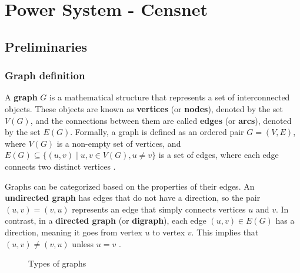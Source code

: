 \chapter{Power System - Censnet} \label{cap:mpcc}

\section{Preliminaries}

\subsection{Graph definition}


A \textbf{graph} $G$ is a mathematical structure that represents a set of interconnected objects. These objects are known as \textbf{vertices} (or \textbf{nodes}), denoted by the set $V(G)$, and the connections between them are called \textbf{edges} (or \textbf{arcs}), denoted by the set $E(G)$. Formally, a graph is defined as an ordered pair $G = (V, E)$, where $V(G)$ is a non-empty set of vertices, and $E(G) \subseteq \{(u, v) \mid u, v \in V(G), u \neq v\}$ is a set of edges, where each edge connects two distinct vertices \cite{Trudeau_2015}.

Graphs can be categorized based on the properties of their edges. An \textbf{undirected graph} has edges that do not have a direction, so the pair $(u, v) = (v, u)$ represents an edge that simply connects vertices $u$ and $v$. In contrast, in a \textbf{directed graph} (or \textbf{digraph}), each edge $(u, v) \in E(G)$ has a direction, meaning it goes from vertex $u$ to vertex $v$. This implies that $(u, v) \neq (v, u)$ unless $u = v$ \cite{Bender_Williamson_2010}.

%
\begin{figure}
    \centering
        \setlength{}        
        \setlength{} 
    \caption{Types of graphs}\label{fig:graph_definition}
\end{figure}

